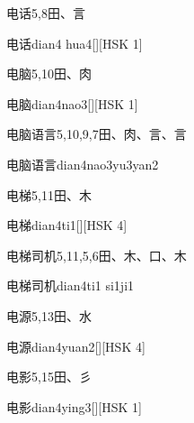 \begin{entry}{电话}{5,8}{⽥、⾔}
  \begin{phonetics}{电话}{dian4 hua4}[][HSK 1]
  \end{phonetics}
\end{entry}

\begin{entry}{电脑}{5,10}{⽥、⾁}
  \begin{phonetics}{电脑}{dian4nao3}[][HSK 1]
  \end{phonetics}
\end{entry}

\begin{entry}{电脑语言}{5,10,9,7}{⽥、⾁、⾔、⾔}
  \begin{phonetics}{电脑语言}{dian4nao3yu3yan2}
  \end{phonetics}
\end{entry}

\begin{entry}{电梯}{5,11}{⽥、⽊}
  \begin{phonetics}{电梯}{dian4ti1}[][HSK 4]
  \end{phonetics}
\end{entry}

\begin{entry}{电梯司机}{5,11,5,6}{⽥、⽊、⼝、⽊}
  \begin{phonetics}{电梯司机}{dian4ti1 si1ji1}
  \end{phonetics}
\end{entry}

\begin{entry}{电源}{5,13}{⽥、⽔}
  \begin{phonetics}{电源}{dian4yuan2}[][HSK 4]
  \end{phonetics}
\end{entry}

\begin{entry}{电影}{5,15}{⽥、⼺}
  \begin{phonetics}{电影}{dian4ying3}[][HSK 1]
  \end{phonetics}
\end{entry}

